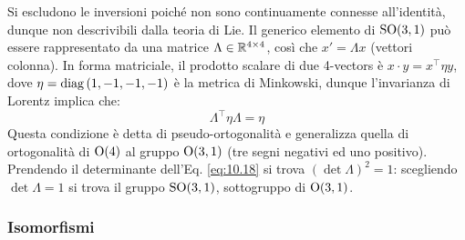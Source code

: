 Si escludono le inversioni poiché non sono continuamente connesse all'identità, dunque non descrivibili dalla teoria di Lie. Il generico elemento di $ \mathrm{SO}(3,1) $ può essere rappresentato da una matrice $ \Lambda \in \mathbb{R}^{4\times4} $, così che $ x' = \Lambda x $ (vettori colonna). In forma matriciale, il prodotto scalare di due 4-vectors è $ x \cdot y = x^{\intercal} \eta y $, dove $ \eta = \operatorname{diag} \left( 1,-1,-1,-1 \right) $ è la metrica di Minkowski, dunque l'invarianza di Lorentz implica che:
\begin{equation}
	\Lambda^{\intercal} \eta \Lambda = \eta
	\label{eq:10.18}
\end{equation}
Questa condizione è detta di pseudo-ortogonalità e generalizza quella di ortogonalità di $ \mathrm{O}(4) $ al gruppo $ \mathrm{O}(3,1) $ (tre segni negativi ed uno positivo). Prendendo il determinante dell'Eq. \ref{eq:10.18} si trova $ \left( \det \Lambda \right)^2 = 1 $: scegliendo $ \det \Lambda = 1 $ si trova il gruppo $ \mathrm{SO}(3,1) $, sottogruppo di $ \mathrm{O}(3,1) $.

\subsubsection{Isomorfismi}

